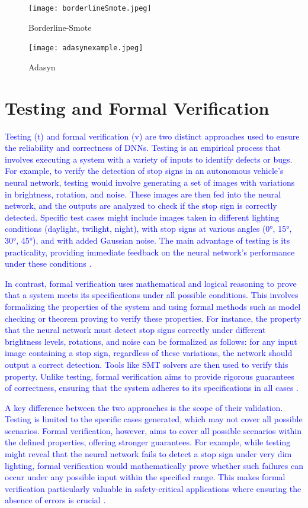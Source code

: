   \begin{figure}
    \centering
    \texttt{[image: borderlineSmote.jpeg]}
    \caption{Borderline-Smote}
    \label{fig:image-trans}
\end{figure}
\begin{figure}
  \centering
  \texttt{[image: adasynexample.jpeg]}
  \caption{Adasyn}
  \label{fig:image-trans}
\end{figure}

\section{Testing and Formal Verification}
\textcolor{blue}{
Testing (t) and formal verification (v) are two distinct approaches used to ensure the reliability and correctness of DNNs. Testing is an empirical process that involves executing a system with a variety of inputs to identify defects or bugs. For example, to verify the detection of stop signs in an autonomous vehicle's neural network, testing would involve generating a set of images with variations in brightness, rotation, and noise. These images are then fed into the neural network, and the outputs are analyzed to check if the stop sign is correctly detected. Specific test cases might include images taken in different lighting conditions (daylight, twilight, night), with stop signs at various angles (0°, 15°, 30°, 45°), and with added Gaussian noise. The main advantage of testing is its practicality, providing immediate feedback on the neural network’s performance under these conditions \cite{Albarghouthi}.}

\textcolor{blue}{In contrast, formal verification uses mathematical and logical reasoning to prove that a system meets its specifications under all possible conditions. This involves formalizing the properties of the system and using formal methods such as model checking or theorem proving to verify these properties. For instance, the property that the neural network must detect stop signs correctly under different brightness levels, rotations, and noise can be formalized as follows: for any input image containing a stop sign, regardless of these variations, the network should output a correct detection. Tools like SMT solvers are then used to verify this property. Unlike testing, formal verification aims to provide rigorous guarantees of correctness, ensuring that the system adheres to its specifications in all cases \cite{DeepMind2023, Albarghouthi}.}

\textcolor{blue}{A key difference between the two approaches is the scope of their validation. Testing is limited to the specific cases generated, which may not cover all possible scenarios. Formal verification, however, aims to cover all possible scenarios within the defined properties, offering stronger guarantees. For example, while testing might reveal that the neural network fails to detect a stop sign under very dim lighting, formal verification would mathematically prove whether such failures can occur under any possible input within the specified range. This makes formal verification particularly valuable in safety-critical applications where ensuring the absence of errors is crucial \cite{Urban2021}.}


